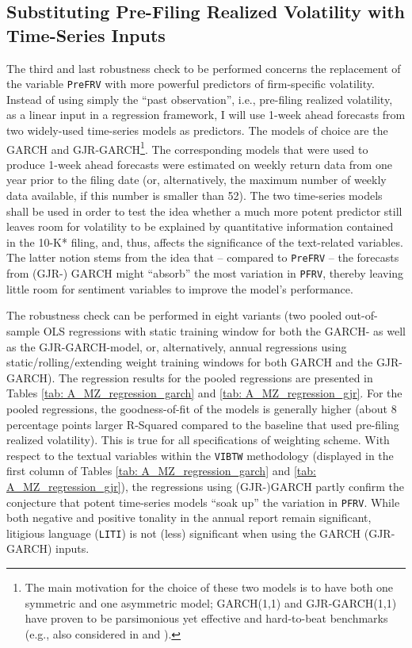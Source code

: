 \subsection{Substituting Pre-Filing Realized Volatility with Time-Series Inputs}
\label{ssec: robust_prefiling}
The third and last robustness check to be performed concerns the replacement of the variable \texttt{PreFRV} with more powerful predictors of firm-specific volatility. Instead of using simply the \enquote{past observation}, i.e., pre-filing realized volatility, as a linear input in a regression framework, I will use 1-week ahead forecasts from two widely-used time-series models as predictors. The models of choice are the GARCH and GJR-GARCH\footnote{The main motivation for the choice of these two models is to have both one symmetric and one asymmetric model; GARCH(1,1) and GJR-GARCH(1,1) have proven to be parsimonious yet effective and hard-to-beat benchmarks (e.g., also considered in \textcite{AntweilerFrank2004} and \textcite{HansenLunde}).}. The corresponding models that were used to produce 1-week ahead forecasts were estimated on weekly return data from one year prior to the filing date (or, alternatively, the maximum number of weekly data available, if this number is smaller than 52). The two time-series models shall be used in order to test the idea whether a much more potent predictor still leaves room for volatility to be explained by quantitative information contained in the 10-K* filing, and, thus, affects the significance of the text-related variables. The latter notion stems from the idea that -- compared to \texttt{PreFRV} -- the forecasts from (GJR-) GARCH might \enquote{absorb} the most variation in \texttt{PFRV}, thereby leaving little room for sentiment variables to improve the model's performance. 

The robustness check can be performed in eight variants (two pooled out-of-sample OLS regressions with static training window for both the GARCH- as well as the GJR-GARCH-model, or,  alternatively, annual regressions using static/rolling/extending weight training windows for both GARCH and the GJR-GARCH). The regression results for the pooled regressions are presented in Tables \ref{tab: A_MZ_regression_garch} and \ref{tab: A_MZ_regression_gjr}. For the pooled regressions, the goodness-of-fit of the models is generally higher (about 8 percentage points larger R-Squared compared to the baseline that used pre-filing realized volatility). This is true for all specifications of weighting scheme. With respect to the textual variables within the \texttt{VIBTW} methodology (displayed in the first column of Tables \ref{tab: A_MZ_regression_garch} and \ref{tab: A_MZ_regression_gjr}), the regressions using (GJR-)GARCH partly confirm the conjecture that potent time-series models \enquote{soak up} the variation in \texttt{PFRV}. While both negative and positive tonality in the annual report remain significant, litigious language (\texttt{LITI}) is not (less) significant when using the GARCH (GJR-GARCH) inputs.

